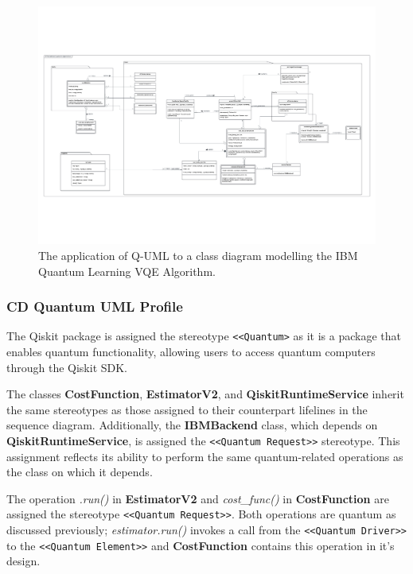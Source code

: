 \documentclass{article}
\begin{document}
\begin{figure}
    \centering
    \includegraphics[width=1\linewidth]{VQE QUML CD Final Version.pdf}
    \caption{The application of Q-UML to a class diagram modelling the IBM Quantum Learning VQE Algorithm.}
    \label{fig:Q-UML_CD}
\end{figure}

\subsubsection{CD Quantum UML Profile}

The Qiskit package is assigned the stereotype \texttt{<<Quantum>} as it is a package that enables quantum functionality, allowing users to access quantum computers through the Qiskit SDK. 

The classes \textbf{CostFunction}, \textbf{EstimatorV2}, and \textbf{QiskitRuntimeService} inherit the same stereotypes as those assigned to their counterpart lifelines in the sequence diagram. Additionally, the \textbf{IBMBackend} class, which depends on \textbf{QiskitRuntimeService}, is assigned the \texttt{<<Quantum Request>>} stereotype. This assignment reflects its ability to perform the same quantum-related operations as the class on which it depends.

The operation \textit{.run()} in \textbf{EstimatorV2} and \textit{cost\_func()} in \textbf{CostFunction} are assigned the stereotype \texttt{<<Quantum Request>>}. Both operations are quantum as discussed previously; \textit{estimator.run()} invokes a call from the \texttt{<<Quantum Driver>>} to the \texttt{<<Quantum Element>>} and \textbf{CostFunction} contains this operation in it's design.
\end{document}
